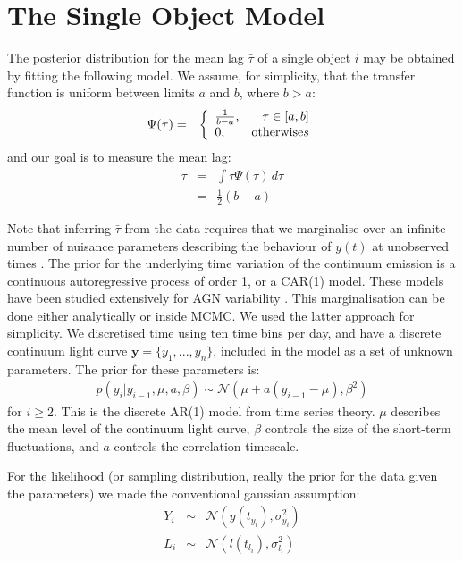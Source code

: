\documentclass[useAMS,usenatbib]{mn2e}
\begin{document}
\section{The Single Object Model}
The posterior distribution for the mean lag $\bar{\tau}$ of a single object
$i$ may be obtained
by fitting the following model. We assume, for simplicity, that
the transfer function is uniform
between limits $a$ and $b$, where $b > a$:
\begin{eqnarray}
\Psi(\tau) &=& \left\{
\begin{array}{lr}
\frac{1}{b-a}, & \tau \in [a,b]\\
0, & \textnormal{otherwise}s
\end{array}\right.
\end{eqnarray}
and our goal is to measure the mean lag:
\begin{eqnarray}
\bar{\tau} &=& \int \tau \Psi(\tau) \, d\tau\\
&=& \frac{1}{2}(b-a)
\end{eqnarray}

Note that inferring $\bar{\tau}$ from the data requires that we
marginalise over an infinite number of nuisance parameters describing the
behaviour of $y(t)$ at unobserved times \citep{pancoast}.
The prior for the underlying time variation of the continuum emission is
a continuous autoregressive process of order 1, or a CAR(1) model. These models
have been studied extensively for AGN variability
\citep[e.g.][]{2009ApJ...698..895K, 2011ApJ...735...80Z, 2013ApJ...765..106Z}.
This marginalisation can be done
either analytically or inside MCMC. We used the latter approach for simplicity.
We discretised
time using ten time bins per day, and have a discrete continuum light curve
$\mathbf{y} = \{y_1, ..., y_n\}$, included in the model as a set of unknown
parameters. The prior for these parameters is:
\begin{eqnarray}
p(y_i | y_{i-1},  \mu, a, \beta) \sim \mathcal{N}
\left(\mu + a\left(y_{i-1} - \mu\right), \beta^2\right)
\end{eqnarray}
for $i \geq 2$. This is the discrete AR(1) model from time series theory.
$\mu$ describes the mean level of the continuum light curve, $\beta$ controls
the size of the short-term fluctuations, and $a$ controls the correlation
timescale.

For the likelihood (or sampling distribution, really the prior for the data
given the parameters) we made the conventional gaussian assumption:
\begin{eqnarray}
Y_i &\sim& \mathcal{N}\left(y(t_{y_i}), \sigma_{y_i}^2\right)\\
L_i &\sim& \mathcal{N}\left(l(t_{l_i}), \sigma_{l_i}^2\right)
\end{eqnarray}
\end{document}
